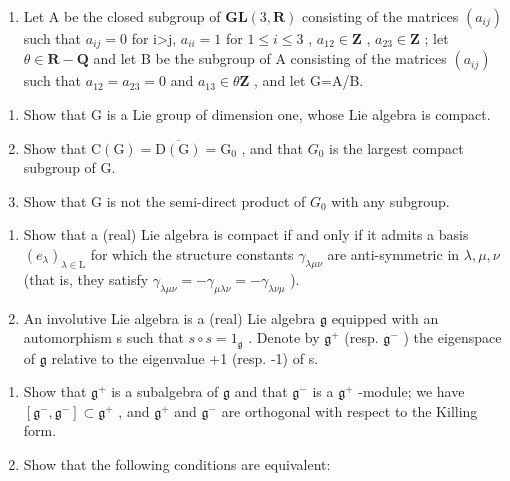 \begin{enumerate}
\def\labelenumi{\arabic{enumi})}
\setcounter{enumi}{4}
\tightlist
\item
  Let A be the closed subgroup of \(\mathbf{GL}(3,\mathbf{R})\) consisting of the matrices \((a_{ij})\) such that \(a_{ij}=0\) for i\textgreater j, \(a_{ii}=1\) for \(1\leq i\leq3\) , \(a_{12}\in \mathbf{Z}\) , \(a_{23}\in \mathbf{Z}\) ; let \(\theta\in \mathbf{R}-\mathbf{Q}\) and let B be the subgroup of A consisting of the matrices \((a_{ij})\) such that \(a_{12}=a_{23}=0\) and \(a_{13}\in\theta\mathbf{Z}\) , and let G=A/B.
\end{enumerate}

\begin{enumerate}
\def\labelenumi{\alph{enumi})}
\item
  Show that G is a Lie group of dimension one, whose Lie algebra is compact.
\item
  Show that \(\mathrm{C}(\mathrm{G}) = \overline{\mathrm{D}(\mathrm{G})} = \mathrm{G}_{0}\) , and that \(G_{0}\) is the largest compact subgroup of G.
\item
  Show that G is not the semi-direct product of \(G_{0}\) with any subgroup.
\end{enumerate}

\begin{enumerate}
\def\labelenumi{\arabic{enumi})}
\setcounter{enumi}{5}
\item
  Show that a (real) Lie algebra is compact if and only if it admits a basis \((e_{\lambda})_{\lambda\in\mathrm{L}}\) for which the structure constants \(\gamma_{\lambda\mu\nu}\) are anti-symmetric in \(\lambda,\mu,\nu\) (that is, they satisfy \(\gamma_{\lambda\mu\nu}=-\gamma_{\mu\lambda\nu}=-\gamma_{\lambda\nu\mu}\) ).
\item
  An involutive Lie algebra is a (real) Lie algebra \(\mathfrak{g}\) equipped with an automorphism s such that \(s \circ s = 1_{\mathfrak{g}}\) . Denote by \(\mathfrak{g}^{+}\) (resp. \(\mathfrak{g}^{-}\) ) the eigenspace of \(\mathfrak{g}\) relative to the eigenvalue +1 (resp. -1) of s.
\end{enumerate}

\begin{enumerate}
\def\labelenumi{\alph{enumi})}
\item
  Show that \(\mathfrak{g}^{+}\) is a subalgebra of \(\mathfrak{g}\) and that \(\mathfrak{g}^{-}\) is a \(\mathfrak{g}^{+}\) -module; we have \([\mathfrak{g}^{-},\mathfrak{g}^{-}] \subset \mathfrak{g}^{+}\) , and \(\mathfrak{g}^{+}\) and \(\mathfrak{g}^{-}\) are orthogonal with respect to the Killing form.
\item
  Show that the following conditions are equivalent:
\end{enumerate}

